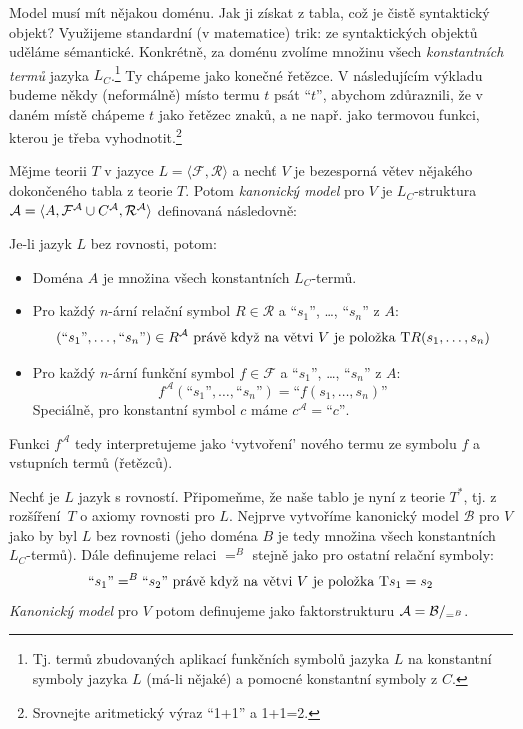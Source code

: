 Model musí mít nějakou doménu. Jak ji získat z tabla, což je čistě syntaktický objekt? Využijeme standardní (v matematice) trik: ze syntaktických objektů uděláme sémantické. Konkrétně, za doménu zvolíme množinu všech \emph{konstantních termů} jazyka $L_C$.\footnote{Tj. termů zbudovaných aplikací funkčních symbolů jazyka $L$ na konstantní symboly jazyka $L$ (má-li nějaké) a pomocné konstantní symboly z $C$.} Ty chápeme jako konečné řetězce. V následujícím výkladu budeme někdy (neformálně) místo termu $t$ psát ``$t$'', abychom zdůraznili, že v daném místě chápeme $t$ jako řetězec znaků, a ne např. jako termovou funkci, kterou je třeba vyhodnotit.\footnote{Srovnejte aritmetický výraz ``1+1'' a 1+1=2.}

\begin{definition}\label{definition:canonical-model-predicate}
Mějme teorii $T$ v jazyce $L=\langle\mathcal F,\mathcal R\rangle$ a nechť $V$ je bezesporná větev nějakého dokončeného tabla z teorie $T$. Potom \emph{kanonický model} pro $V$ je $L_C$-struktura $\mathcal{A}=\langle A,\mathcal F^\mathcal A\cup C^\mathcal A,\mathcal R^\mathcal A\rangle$ definovaná následovně:

Je-li jazyk $L$ bez rovnosti, potom:
\begin{itemize}
    \item Doména $A$ je množina všech konstantních $L_C$-termů.
    \item Pro každý $n$-ární relační symbol $R\in\mathcal R$ a ``$s_1$'', \dots, ``$s_n$'' z $A$:
    $$
    (\text{``$s_1$''},\dots,\text{``$s_n$''})\in R^\mathcal A\text{ právě když na větvi $V$ je položka $\mathrm{T} R(s_1,\dots,s_n)$}
    $$
    \item Pro každý $n$-ární funkční symbol $f\in\mathcal F$ a ``$s_1$'', \dots, ``$s_n$'' z $A$:
    $$
    f^\mathcal A(\text{``$s_1$''},\dots,\text{``$s_n$''})=\text{``$f(s_1,\dots,s_n)$''}
    $$
    Speciálně, pro konstantní symbol $c$ máme $c^\mathcal A=\text{``$c$''}$.
\end{itemize}
Funkci $f^\mathcal A$ tedy interpretujeme jako `vytvoření' nového termu ze symbolu $f$ a vstupních termů (řetězců). 

Nechť je $L$ jazyk s rovností. Připomeňme, že naše tablo je nyní z teorie $T^*$, tj. z rozšíření~$T$ o axiomy rovnosti pro $L$. Nejprve vytvoříme kanonický model $\mathcal B$ pro $V$ jako by byl $L$ bez rovnosti (jeho doména $B$ je tedy množina všech konstantních $L_C$-termů). Dále definujeme relaci $=^B$ stejně jako pro ostatní relační symboly:
$$
\text{``$s_1$''}=^B\text{``$s_2$''}\text{ právě když na větvi $V$ je položka $\mathrm{T} s_1=s_2$}
$$
\emph{Kanonický model} pro $V$ potom definujeme jako faktorstrukturu $\mathcal{A}=\mathcal{B}/_{=^B}$.
\end{definition}

